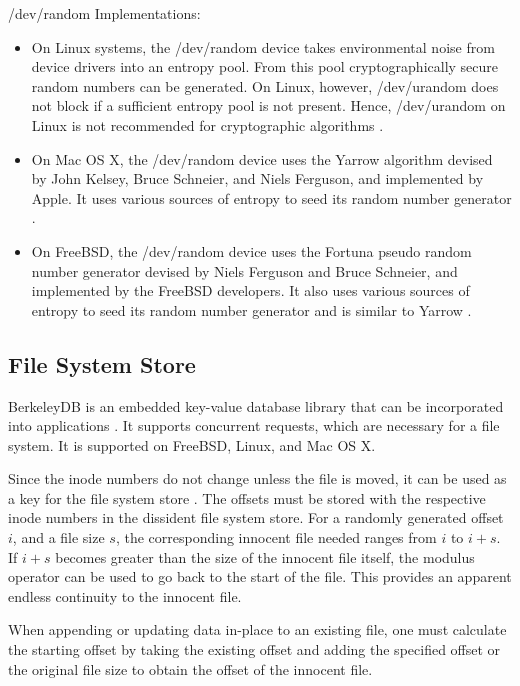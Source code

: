 \documentclass[10pt,twocolumn]{article}
\begin{document}
/dev/random Implementations:
\begin{itemize}
\item On Linux systems, the /dev/random device takes environmental noise from device drivers into an entropy pool. From this pool cryptographically secure random numbers can be generated.  On Linux, however, /dev/urandom does not block if a sufficient entropy pool is not present. Hence, /dev/urandom on Linux is not recommended for cryptographic algorithms \cite{linuxrandom}.
\item On Mac OS X, the /dev/random device uses the Yarrow algorithm devised by John Kelsey, Bruce Schneier, and Niels Ferguson, and implemented by Apple. It uses various sources of entropy to seed its random number generator \cite{yarrow}.
\item On FreeBSD, the /dev/random device uses the Fortuna pseudo random number generator devised by Niels Ferguson and Bruce Schneier, and implemented by the FreeBSD developers. It also uses various sources of entropy to seed its random number generator and is similar to Yarrow \cite{fortuna}.
\end{itemize}

\subsection{File System Store}

BerkeleyDB is an embedded key-value database library that can be incorporated into applications \cite{berkeleydb}. It supports concurrent requests, which are necessary for a file system. It is supported on FreeBSD, Linux, and Mac OS X.

Since the inode numbers do not change unless the file is moved, it can be used as a key for the file system store \cite{astmos}. The offsets must be stored with the respective inode numbers in the dissident file system store. For a randomly generated offset $i$, and a file size $s$, the corresponding innocent file needed ranges from $i$ to $i + s$. If $i + s$ becomes greater than the size of the innocent file itself, the modulus operator can be used to go back to the start of the file. This provides an apparent endless continuity to the innocent file.

When appending or updating data in-place to an existing file, one must calculate the starting offset by taking the existing offset and adding the specified offset or the original file size to obtain the offset of the innocent file.

\end{document}
